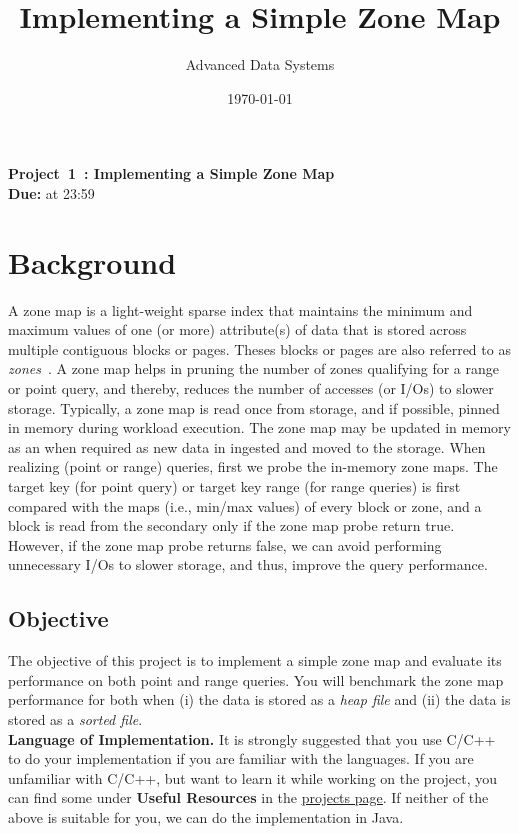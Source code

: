 \documentclass[12pt,a4paper,twoside]{article}
\title{Implementing a Simple Zone Map}
\author{Advanced Data Systems}
\date{\today}
\newcommand{\assignmenttype}{Project}       %
\newcommand{\assignmentnumber}{1}           %
\newcommand{\smallspace}{0.2cm}
\begin{document}
\begin{center}
    \textbf{\assignmenttype\ \assignmentnumber\ \:: Implementing a Simple Zone Map}\\
    \vspace{\smallspace}
    \textbf{Due:}  at 23:59
\end{center}



\section*{Background}
A zone map is a light-weight sparse index that maintains the minimum and maximum values of one (or more) attribute(s) of data that is stored across multiple contiguous blocks or pages.
Theses blocks or pages are also referred to as \textit{zones}~\cite{ZWKPLK2017}. 
A zone map helps in pruning the number of zones qualifying for a range or point query, and thereby, reduces the number of accesses (or I/Os) to slower storage. 
Typically, a zone map is read once from storage, and if possible, pinned in memory during workload execution. 
The zone map may be updated in memory as an when required as new data in ingested and moved to the storage. 
When realizing (point or range) queries, first we probe the in-memory zone maps. 
The target key (for point query) or target key range (for range queries) is first compared with the maps (i.e., min/max values) of every block or zone, and a block is read from the secondary only if the zone map probe return true. 
However, if the zone map probe returns false, we can avoid performing unnecessary I/Os to slower storage, and thus, improve the query performance. 

\subsection*{Objective}
The objective of this project is to implement a simple zone map and evaluate its performance on both point and range queries. 
You will benchmark the zone map performance for both when (i) the data is stored as a \textit{heap file} and (ii) the data is stored as a \textit{sorted file}. \\

\noindent \textbf{Language of Implementation.} It is strongly suggested that you use C/C++ to do your implementation if you are familiar with the languages. 
If you are unfamiliar with C/C++, but want to learn it while working on the project, you can find some under \textbf{Useful Resources} in the \href{https://ssd-brandeis.github.io/COSI-167A/assignments/}{\underline{projects page}}. 
If neither of the above is suitable for you, we can do the implementation in Java. \\
\end{document}
